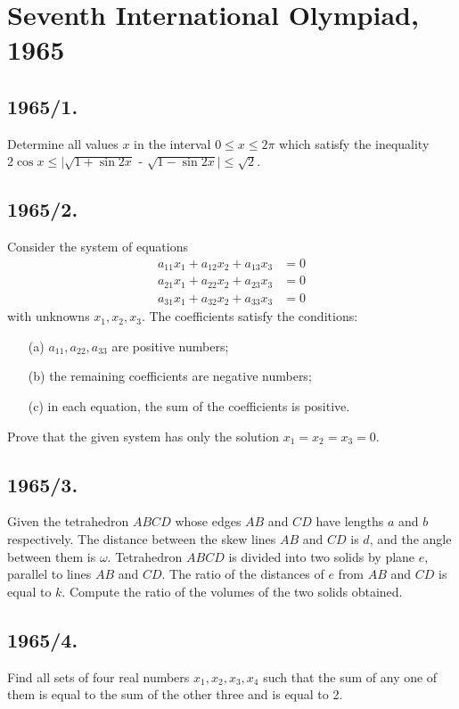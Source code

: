 \documentclass{article}
\begin{document}
\section*{Seventh International Olympiad, 1965}

\subsection*{1965/1.}
Determine all values $x$ in the interval $0 \leq x \leq 2\pi$ which satisfy the inequality ${2 \cos x \leq \vert \sqrt {1 + \sin{2x}}}$ - $ \sqrt{1 - \sin{2x}} \vert \leq \sqrt{2}$.

\subsection*{1965/2.}
Consider the system of equations
\[
\begin{aligned}
a_{11}x_1 + a_{12}x_2 + a_{13}x_3 & = 0 \\
a_{21}x_1 + a_{22}x_2 + a_{23}x_3 & = 0 \\
a_{31}x_1 + a_{32}x_2 + a_{33}x_3 & = 0
\end{aligned}
\]
with unknowns $x_1, x_2, x_3$. The coefficients satisfy the conditions:
\begin{enumerate}
    \item[(a)] $a_{11}, a_{22}, a_{33}$ are positive numbers;
    \item[(b)] the remaining coefficients are negative numbers;
    \item[(c)] in each equation, the sum of the coefficients is positive.
\end{enumerate}
Prove that the given system has only the solution $x_1 = x_2 = x_3 = 0$.

\subsection*{1965/3.}
Given the tetrahedron $ABCD$ whose edges $AB$ and $CD$ have lengths $a$ and $b$ respectively. The distance between the skew lines $AB$ and $CD$ is $d$, and the angle between them is $\omega$. Tetrahedron $ABCD$ is divided into two solids by plane $e$, parallel to lines $AB$ and $CD$. The ratio of the distances of $e$ from $AB$ and $CD$ is equal to $k$. Compute the ratio of the volumes of the two solids obtained.

\subsection*{1965/4.}
Find all sets of four real numbers $x_1, x_2, x_3, x_4$ such that the sum of any one of them is equal to the sum of the other three and is equal to 2.
\end{document}
